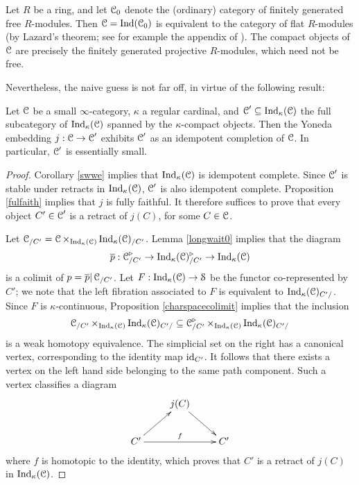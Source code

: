 \begin{example}
Let $R$ be a ring, and let $\operatorname{\mathcal{C}}_0$ denote the (ordinary)
category of finitely generated free $R$-modules. Then $\operatorname{\mathcal{C}} =
\operatorname{Ind}(\operatorname{\mathcal{C}}_0)$ is equivalent to the category of flat $R$-modules
(by Lazard's theorem; see for example the appendix of
\cite{lazard}). The compact objects of $\operatorname{\mathcal{C}}$ are precisely the
finitely generated projective $R$-modules, which need not be free.
\end{example}

Nevertheless, the naive guess is not far off, in virtue of the following result:

\begin{lemma}\label{stylus}
Let $\operatorname{\mathcal{C}}$ be a small $\infty$-category, $\kappa$ a regular cardinal, and
$\operatorname{\mathcal{C}}' \subseteq \operatorname{Ind}_{\kappa}(\operatorname{\mathcal{C}})$ the full subcategory of $\operatorname{Ind}_{\kappa}(\operatorname{\mathcal{C}})$ spanned by the $\kappa$-compact objects. Then the Yoneda embedding
$j: \operatorname{\mathcal{C}} \rightarrow \operatorname{\mathcal{C}}'$ exhibits $\operatorname{\mathcal{C}}'$ as an idempotent completion of $\operatorname{\mathcal{C}}$. In particular, $\operatorname{\mathcal{C}}'$ is essentially small.
\end{lemma}

\begin{proof}
Corollary \ref{swwe} implies that $\operatorname{Ind}_{\kappa}(\operatorname{\mathcal{C}})$ is idempotent complete. Since $\operatorname{\mathcal{C}}'$ is stable under retracts in $\operatorname{Ind}_{\kappa}(\operatorname{\mathcal{C}})$, $\operatorname{\mathcal{C}}'$ is also idempotent complete. Proposition \ref{fulfaith} implies that $j$ is fully faithful. It therefore suffices to prove that every object $C' \in \operatorname{\mathcal{C}}'$ is a retract of $j(C)$, for some $C \in \operatorname{\mathcal{C}}$. 

Let $\operatorname{\mathcal{C}}_{/C'} = \operatorname{\mathcal{C}} \times_{ \operatorname{Ind}_{\kappa}(\operatorname{\mathcal{C}})} \operatorname{Ind}_{\kappa}(\operatorname{\mathcal{C}})_{/C'}$. Lemma \ref{longwait0} implies that the diagram
$$ \overline{p}: \operatorname{\mathcal{C}}_{/C'}^{\triangleright} \rightarrow \operatorname{Ind}_{\kappa}(\operatorname{\mathcal{C}})_{/C'}^{\triangleright} \rightarrow \operatorname{Ind}_{\kappa}(\operatorname{\mathcal{C}})$$ is a colimit of $p= \overline{p} | \operatorname{\mathcal{C}}_{/C'}$. Let $F: \operatorname{Ind}_{\kappa}(\operatorname{\mathcal{C}}) \rightarrow \operatorname{\mathcal{S}}$ be the functor co-represented by $C'$; we note that the left fibration associated to $F$ is equivalent to $\operatorname{Ind}_{\kappa}(\operatorname{\mathcal{C}})_{C'/}$. Since $F$ is $\kappa$-continuous, Proposition \ref{charspacecolimit} implies that the inclusion
$$\operatorname{\mathcal{C}}_{/C'} \times_{ \operatorname{Ind}_{\kappa}(\operatorname{\mathcal{C}})} \operatorname{Ind}_{\kappa}(\operatorname{\mathcal{C}})_{C'/}
\subseteq \operatorname{\mathcal{C}}^{\triangleright}_{/C'} \times_{ \operatorname{Ind}_{\kappa}(\operatorname{\mathcal{C}})} \operatorname{Ind}_{\kappa}(\operatorname{\mathcal{C}})_{C'/}$$
is a weak homotopy equivalence. The simplicial set on the right has a canonical vertex, corresponding to the identity map $\operatorname{id}_{C'}$. It follows that there exists a vertex on the left hand side belonging to the same path component. Such a vertex classifies a diagram
$$ \xymatrix{ & j(C) \ar[dr] & \\
C' \ar[ur] \ar[rr]^{f} & & C' }$$ where $f$ is homotopic to the identity, which proves that $C'$ is a retract of $j(C)$ in $\operatorname{Ind}_{\kappa}(\operatorname{\mathcal{C}})$.
\end{proof}

